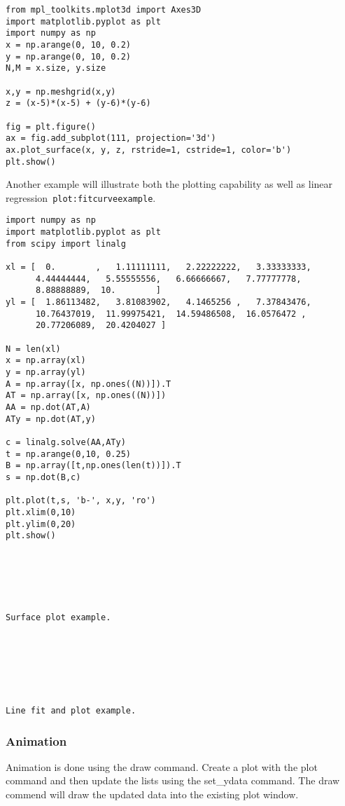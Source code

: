 \begin{verbatim}
from mpl_toolkits.mplot3d import Axes3D
import matplotlib.pyplot as plt
import numpy as np
x = np.arange(0, 10, 0.2)
y = np.arange(0, 10, 0.2)
N,M = x.size, y.size

x,y = np.meshgrid(x,y)
z = (x-5)*(x-5) + (y-6)*(y-6)

fig = plt.figure()
ax = fig.add_subplot(111, projection='3d')
ax.plot_surface(x, y, z, rstride=1, cstride=1, color='b')
plt.show()
\end{verbatim}

Another example will illustrate both the plotting capability as well as
linear regression~\texttt{plot:fitcurveexample}.

\begin{verbatim}
import numpy as np
import matplotlib.pyplot as plt
from scipy import linalg

xl = [  0.        ,   1.11111111,   2.22222222,   3.33333333,
      4.44444444,   5.55555556,   6.66666667,   7.77777778,
      8.88888889,  10.        ]
yl = [  1.86113482,   3.81083902,   4.1465256 ,   7.37843476,
      10.76437019,  11.99975421,  14.59486508,  16.0576472 ,
      20.77206089,  20.4204027 ]

N = len(xl)
x = np.array(xl)
y = np.array(yl)
A = np.array([x, np.ones((N))]).T
AT = np.array([x, np.ones((N))])
AA = np.dot(AT,A)
ATy = np.dot(AT,y)

c = linalg.solve(AA,ATy)
t = np.arange(0,10, 0.25)
B = np.array([t,np.ones(len(t))]).T
s = np.dot(B,c)

plt.plot(t,s, 'b-', x,y, 'ro')
plt.xlim(0,10)
plt.ylim(0,20)
plt.show()






Surface plot example.







Line fit and plot example.
\end{verbatim}

\hypertarget{animation}{%
\subsubsection{Animation}\label{animation}}

Animation is done using the draw command. Create a plot with the plot
command and then update the lists using the set\_ydata command. The draw
commend will draw the updated data into the existing plot window.

